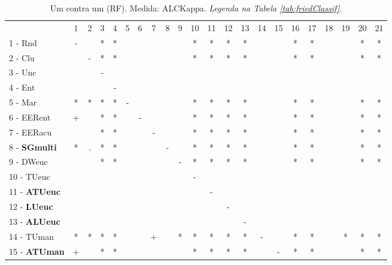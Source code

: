 \begin{table}[h]
\caption{Um contra um (RF). Medida: ALCKappa. \textit{Legenda na Tabela \ref{tab:friedClassif}.}}
\begin{center}\begin{tabular}{lcc|cc|cc|cc|cc|cc|cc|cc|cc|cc|c}
 			& 1 & 2 & 3 & 4 & 5 & 6 & 7 & 8 & 9 & 10 & 11 & 12 & 13 & 14 & 15 & 16 & 17 & 18 & 19 & 20 & 21\\
1 - Rnd  	& - &   & * & * &   &   &   &   &   & * & * & * & * &   &   & * & * &   &   & * & * \\
2 - Clu  	&   & - & * & * &   &   &   &   &   & * & * & * & * &   &   & * & * &   &   & * & * \\ \hline
3 - Unc  	&   &   & - &   &   &   &   &   &   &   &   &   &   &   &   &   &   &   &   &   &   \\
4 - Ent  	&   &   &   & - &   &   &   &   &   &   &   &   &   &   &   &   &   &   &   &   &   \\ \hline
5 - Mar  	& * & * & * & * & - &   &   &   &   & * & * & * & * &   &   & * & * &   &   & * & * \\
6 - EERent	& + &   & * & * &   & - &   &   &   & * & * & * & * &   &   & * & * &   &   & * & * \\ \hline
7 - EERacu	&   &   & * & * &   &   & - &   &   & * & * & * & * &   &   & * & * &   &   & * & * \\
8 - \textbf{SGmulti}	& * & . & * & * &   &   &   & - &   & * & * & * & * &   &   & * & * &   &   & * & * \\ \hline
9 - DWeuc	&   &   & * & * &   &   &   &   & - & * & * & * & * &   &   & * & * &   &   & * & * \\
10 - TUeuc	&   &   &   &   &   &   &   &   &   & - &   &   &   &   &   &   &   &   &   &   &   \\ \hline
11 - \textbf{ATUeuc}	&   &   &   &   &   &   &   &   &   &   & - &   &   &   &   &   &   &   &   &   &   \\
12 - \textbf{LUeuc}	&   &   &   &   &   &   &   &   &   &   &   & - &   &   &   &   &   &   &   &   &   \\ \hline
13 - \textbf{ALUeuc}	&   &   &   &   &   &   &   &   &   &   &   &   & - &   &   &   &   &   &   &   &   \\
14 - TUman	& * & * & * & * &   &   & + &   & * & * & * & * & * & - &   & * & * &   & * & * & * \\ \hline
15 - \textbf{ATUman}	& + &   & * & * &   &   &   &   &   & * & * & * & * &   & - & * & * &   &   & * & * \\

\end{tabular}
\end{center}
\end{table}
